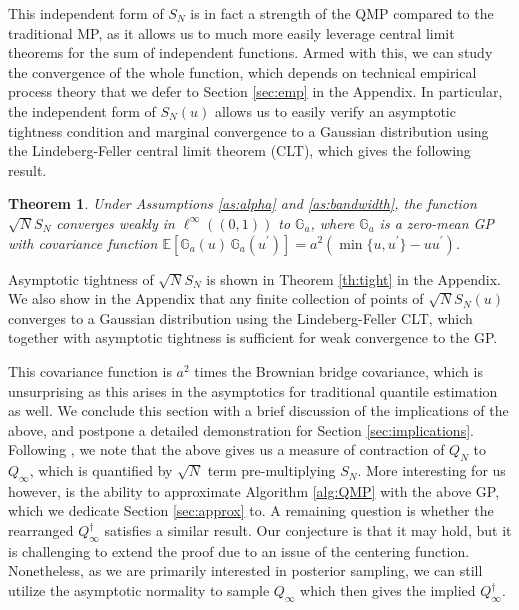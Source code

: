 \documentclass[11pt,a4paper]{article}
\newtheorem{theorem}{Theorem}%
\newenvironment{proof_outline}{\begin{proof}[Proof outline]}{\end{proof}}
\newcommand{\E}{\mathbb{E}}
\begin{document}
This independent form of $S_N$ is in fact a strength of the QMP compared to the traditional MP, as it allows us to much more easily leverage central limit theorems for the sum of independent functions.
Armed with this, we can study the convergence of the whole function, which depends on technical empirical process theory that we defer to Section \ref{sec:emp} in the Appendix. In particular, the independent form of $S_N(u)$ allows us to easily verify an asymptotic tightness condition and marginal convergence to a Gaussian distribution using the Lindeberg-Feller central limit theorem (CLT), which gives the following result.
\begin{theorem}\label{th:gp}
    Under {Assumptions \ref{as:alpha}} and {\ref{as:bandwidth}}, the function $\sqrt{N}S_N$ converges weakly in $\ell^\infty\left((0,1)\right)$  to $\mathbb{G}_a$, where $\mathbb{G}_a$ is a zero-mean GP with covariance function
$\E\left[\mathbb{G}_a(u)\, \mathbb{G}_a(u^{\prime})\right] = a^2 (\min\{u,u^{\prime}\} - uu^{\prime})$. 
\end{theorem}
\begin{proof_outline}
  Asymptotic tightness of $\sqrt{N}S_N$ is shown in {Theorem \ref{th:tight}} in the Appendix.
  We also show in the Appendix that any finite collection of points of $\sqrt{N}S_N(u)$ converges to a Gaussian distribution using the Lindeberg-Feller CLT, which together with asymptotic tightness is sufficient for weak convergence to the GP.
\end{proof_outline}
This covariance function is $a^{2}$ times the Brownian bridge covariance, which is unsurprising as this arises in the asymptotics for traditional quantile estimation as well.
We conclude this section with a brief discussion of the implications of the above, and postpone a detailed demonstration for Section \ref{sec:implications}. Following \cite{Fortini2020}, we note that the above gives us a measure of contraction of $Q_N$ to $Q_\infty$, which is quantified by $\sqrt{N}$ term pre-multiplying $S_N$. More interesting for us however, is the ability to approximate {Algorithm \ref{alg:QMP}} with the above GP, which we dedicate Section \ref{sec:approx} to. A remaining question is whether the rearranged $Q_\infty^{\dagger}$ satisfies a similar result. Our conjecture is that it may hold, but it is challenging to extend the proof due to an issue of the centering function. Nonetheless, as we are primarily interested in posterior sampling, we can still utilize the asymptotic normality to sample $Q_\infty$ which then gives the implied $Q_\infty^{\dagger}$.
\end{document}
